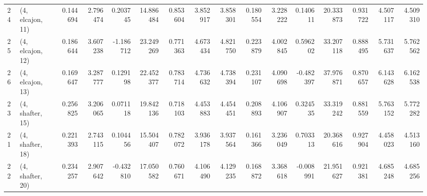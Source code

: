 \begin{tabular}{llrrrrrrrrrrrrrr}
24 &  (4, elcajon, 11) &   0.144694 &  2.796474 &  0.203745 &  14.886484 &  0.853604 &   3.852917 &  3.858301 &  0.180554 &   3.228222 &  0.140611 &   20.333873 &  0.931722 &   4.507117 &   4.509310 \\
25 &  (4, elcajon, 12) &   0.186644 &  3.607238 & -1.186712 &  23.249269 &  0.771363 &   4.673434 &  4.821750 &  0.223879 &   4.002845 &  0.596202 &   33.207118 &  0.888495 &   5.731637 &   5.762562 \\
26 &  (4, elcajon, 13) &   0.169647 &  3.287777 &  0.129198 &  22.452377 &  0.783714 &   4.736632 &  4.738394 &  0.231107 &   4.090698 & -0.482397 &   37.976871 &  0.870657 &   6.143628 &   6.162538 \\
23 &  (4, shafter, 15) &   0.256825 &  3.206065 &  0.071118 &  19.842136 &  0.718103 &   4.453883 &  4.454451 &  0.208893 &   4.106907 &  0.324535 &   33.319242 &  0.881559 &   5.763152 &   5.772282 \\
21 &  (4, shafter, 18) &   0.221393 &  2.743115 &  0.104456 &  15.504407 &  0.782072 &   3.936178 &  3.937564 &  0.161366 &   3.236049 &  0.703313 &   20.368616 &  0.927904 &   4.458023 &   4.513160 \\
22 &  (4, shafter, 20) &   0.234257 &  2.907642 & -0.432810 &  17.050582 &  0.760671 &   4.106490 &  4.129235 &  0.168872 &   3.368618 & -0.008991 &   21.951627 &  0.921381 &   4.685248 &   4.685256 \\
\bottomrule
\end{tabular}
